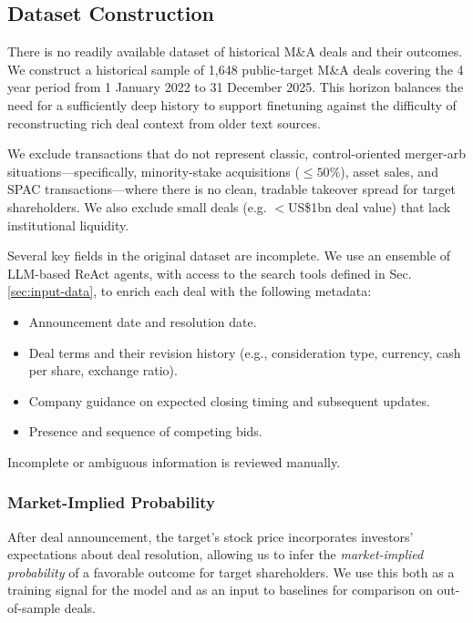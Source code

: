 \documentclass{article}
\theoremstyle{plain}
\theoremstyle{definition}
\theoremstyle{remark}
\begin{document}
\subsection{Dataset Construction}

There is no readily available dataset of historical M\&A deals and their outcomes. We construct a historical sample of 1,648 public-target M\&A deals 
covering the 4 year period from 1 January 2022 to 31 December 2025.
This horizon balances the need for a sufficiently deep history to support finetuning against the difficulty of reconstructing rich deal context from older text sources.

We exclude transactions that do not represent classic, control-oriented merger-arb situations---specifically, minority-stake acquisitions ($\le 50\%$), asset sales, and SPAC transactions---where there is no clean, tradable takeover spread for target shareholders. We also exclude small deals (e.g. $<$US\$1bn deal value) that lack institutional liquidity.

Several key fields in the original dataset are incomplete. We use an ensemble of LLM-based ReAct \cite{yao2022react} agents, with access to the search tools defined in Sec. \ref{sec:input-data}, to enrich each deal with the following metadata:

\begin{itemize}
    \item Announcement date and resolution date.
    \item Deal terms and their revision history (e.g., consideration type, currency, cash per share, exchange ratio).
    \item Company guidance on expected closing timing and subsequent updates.
    \item Presence and sequence of competing bids.
\end{itemize}
\noindent
Incomplete or ambiguous information is reviewed manually. 

\subsubsection{Market-Implied Probability}
\label{sec:implied-prob}

After deal announcement, the target’s stock price incorporates investors’ expectations about deal resolution, allowing us to infer the \emph{market-implied probability} of a favorable outcome for target shareholders. We use this both as a training signal for the model and as an input to baselines for comparison on out-of-sample deals.
\end{document}
